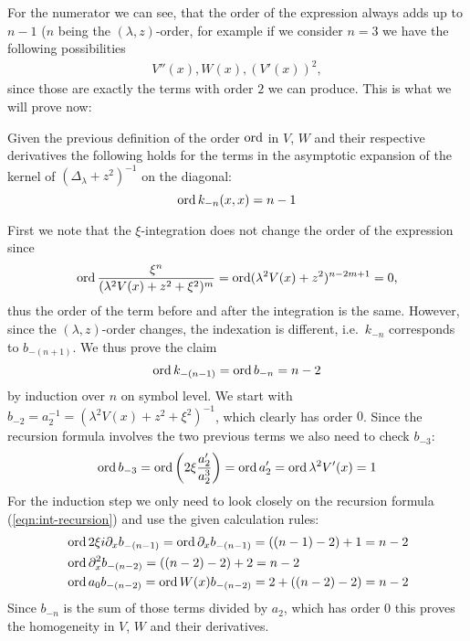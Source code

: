 For the numerator we can see, that the order of the expression always adds up to
$n-1$ ($n$ being the $(\lambda,z)$-order, for example if we consider $n=3$ we
have the following possibilities
\begin{align*}
  V''(x), W(x), (V'(x))^2,
\end{align*}
since those are exactly the terms with order $2$ we can produce. This is what we
will prove now:
\begin{MainTheorem}
  Given the previous definition of the order $\operatorname{ord}$ in $V$, $W$ and their
  respective derivatives the following holds for the terms in the asymptotic
  expansion of the kernel of $(\Delta_\lambda + z^2)^{-1}$ on the diagonal:
  \begin{equation}
    \label{eqn:ord-vs-mu-order}
    \operatorname{ord} k_{-n}(x, x) = n - 1
  \end{equation}
  \begin{Proof}
    First we note that the $\xi$-integration does not change the order of the
    expression since
    \begin{equation*}
      \operatorname{ord} \frac{\xi^n}{(\lambda^2 V(x) + z^2 + \xi^2)^m} = \operatorname{ord} (\lambda^2 V(x)
      + z^2)^{n-2m+1} = 0,
    \end{equation*}
    thus the order of the term before and after the integration is the same.
    However, since the $(\lambda,z)$-order changes, the indexation is different,
    i.e.\ $k_{-n}$ corresponds to $b_{-(n+1)}$. We
    thus prove the claim
    \begin{equation*}
      \operatorname{ord} k_{-(n-1)} = \operatorname{ord} b_{-n} = n - 2
    \end{equation*}
    by induction over $n$ on symbol level. We start with $b_{-2} = a_2^{-1} =
    (\lambda^2 V(x) + z^2 + \xi^2)^{-1}$, which clearly has order $0$. Since the
    recursion formula involves the two previous terms we also need to check
    $b_{-3}$:
    \begin{equation*}
      \operatorname{ord} b_{-3} = \operatorname{ord}\left(2\xi \frac{a_2'}{a_2^3}\right) = \operatorname{ord} a_2' = \operatorname{ord}
      \lambda^2 V'(x) = 1
    \end{equation*}
    For the induction step we only need to look closely on the recursion formula
    (\cref{eqn:int-recursion}) and use the given calculation rules:
    \begin{align*}
      &\operatorname{ord} 2\xi i \partial_x b_{-(n-1)} = \operatorname{ord} \partial_x b_{-(n-1)} = ((n-1) - 2) +
      1 = n - 2\\
      &\operatorname{ord} \partial_x^2 b_{-(n-2)} = ((n - 2) - 2) + 2 = n - 2 \\
      &\operatorname{ord} a_0 b_{-(n-2)} = \operatorname{ord} W(x) b_{-(n-2)} = 2 + ((n-2) - 2) = n - 2
    \end{align*}
    Since $b_{-n}$ is the sum of those terms divided by $a_2$, which has order
    $0$ this proves the homogeneity in $V$, $W$ and their derivatives.
  \end{Proof}
\end{MainTheorem}
